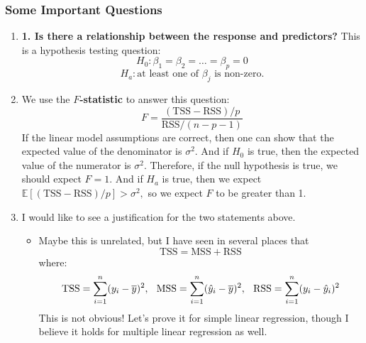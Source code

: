 \documentclass[10pt]{article}
\newcommand{\EE}{{\mathbb{E}}}
\begin{document}
\subsubsection{Some Important Questions} 
\begin{enumerate}
	\item \textbf{1. Is there a relationship between the response and predictors?}  This is a hypothesis testing question:
	$$H_0 : \beta_1 = \beta_2 = \dots = \beta_p = 0$$
	$$H_a : \text{at least one of $\beta_j$ is non-zero.}$$
	\item We use the \textbf{$F$-statistic} to answer this question:
	$$F = \dfrac{(\text{TSS} - \text{RSS}) / p}{\text{RSS}/(n - p - 1)}$$
	If the linear model assumptions are correct, then one can show that the expected value of the denominator is $\sigma^2$.  And if $H_0$ is true, then the expected value of the numerator is $\sigma^2$.  Therefore, if the null hypothesis is true, we should expect $F = 1$.  And if $H_a$ is true, then we expect $\EE[(\text{TSS} - \text{RSS})/p] > \sigma^2,$ so we expect $F$ to be greater than 1. 
	\item {\color{brown} I would like to see a justification for the two statements above.  
		
		\begin{itemize}
			\item Maybe this is unrelated, but I have seen in several places that $$\text{TSS} = \text{MSS} + \text{RSS}$$ where:
			$$\text{TSS} = \sum_{i = 1}^n (y_i - \overline{y})^2, \hspace{.1in} \text{MSS} = \sum_{i = 1}^n (\hat y_i - \overline{y})^2, \hspace{.1in} \text{RSS} = \sum_{i = 1}^n (y_i - \hat y_i )^2$$
			This is not obvious!  Let's prove it for simple linear regression, though I believe it holds for multiple linear regression as well.
			

\end{itemize}}
\end{enumerate}
\end{document}
